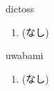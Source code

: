 \begin{prework}{ dictoss }
  \begin{enumerate}
  \item (なし)
  \end{enumerate}
\end{prework}

\begin{prework}{ uwabami }
  \begin{enumerate}
  \item (なし)
  \end{enumerate}
\end{prework}
